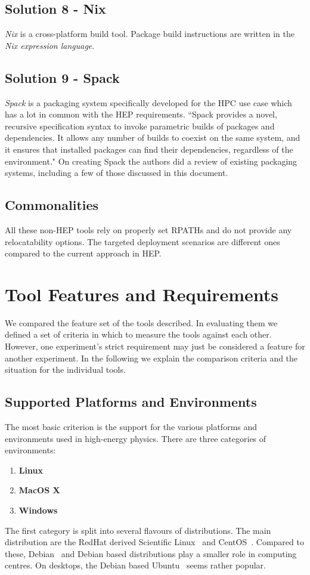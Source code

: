 \documentclass[12pt,a4paper]{article}
\begin{document}
\subsection{Solution 8 - Nix }
\emph{Nix}\cite{nix} is a cross-platform build tool. Package build instructions are written in the \emph{Nix expression language}.

\subsection{Solution 9 - Spack }
\emph{Spack}\cite{Spack} is a packaging system specifically developed for the HPC use case which has a lot in common with the HEP requirements.
``Spack provides a novel, recursive specification syntax to invoke parametric builds of packages and dependencies. It allows any number of builds to coexist on the same system, and it ensures that installed packages can find their dependencies, regardless of the environment." On creating Spack the authors did a review of existing packaging systems, including a few of those discussed in this document.

\subsection{Commonalities}
All these non-HEP tools rely on properly set RPATHs and do not provide any relocatability options. The targeted deployment scenarios are  different ones compared to the current approach in HEP.

\section{Tool Features and Requirements}
We compared the feature set of the tools described. In evaluating them we
defined a set of criteria in which to measure the tools against each other.
However, one experiment's strict requirement may just be considered a feature
for another experiment. In the following we explain the comparison criteria and
the situation for the individual tools.

\subsection{Supported Platforms and Environments}
The most basic criterion is the support for the various platforms and
environments used in high-energy physics. There are three categories of
environments:
\begin{enumerate}
\item \textbf{Linux}
\item \textbf{MacOS X}
\item \textbf{Windows}
\end{enumerate}
The first category is split into several flavours of distributions. The main
distribution are the RedHat derived Scientific Linux~\cite{sl} and
CentOS~\cite{centos}. Compared to these, Debian~\cite{debian} and Debian based
distributions play a smaller role in computing centres. On desktops, the Debian
based Ubuntu~\cite{ubuntu} seems rather popular.
\end{document}
